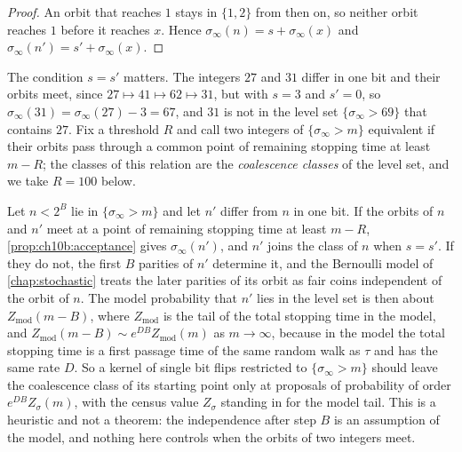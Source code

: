 \begin{proof}
An orbit that reaches $1$ stays in $\{1,2\}$ from then on, so neither orbit reaches $1$ before it reaches $x$. Hence $\sigma_\infty(n)=s+\sigma_\infty(x)$ and $\sigma_\infty(n')=s'+\sigma_\infty(x)$.
\end{proof}

The condition $s=s'$ matters. The integers $27$ and $31$ differ in one bit and their orbits meet, since $27\mapsto41\mapsto62\mapsto31$, but with $s=3$ and $s'=0$, so $\sigma_\infty(31)=\sigma_\infty(27)-3=67$, and $31$ is not in the level set $\{\sigma_\infty>69\}$ that contains $27$.
Fix a threshold $R$ and call two integers of $\{\sigma_\infty>m\}$ equivalent if their orbits pass through a common point of remaining stopping time at least $m-R$; the classes of this relation are the \emph{coalescence classes} of the level set, and we take $R=100$ below.

\begin{remark}\label{rem:ch10c:coalescence}
Let $n<2^B$ lie in $\{\sigma_\infty>m\}$ and let $n'$ differ from $n$ in one bit. If the orbits of $n$ and $n'$ meet at a point of remaining stopping time at least $m-R$, \cref{prop:ch10b:acceptance} gives $\sigma_\infty(n')$, and $n'$ joins the class of $n$ when $s=s'$. If they do not, the first $B$ parities of $n'$ determine it, and the Bernoulli model of \cref{chap:stochastic} treats the later parities of its orbit as fair coins independent of the orbit of $n$. The model probability that $n'$ lies in the level set is then about $Z_{\mathrm{mod}}(m-B)$, where $Z_{\mathrm{mod}}$ is the tail of the total stopping time in the model, and $Z_{\mathrm{mod}}(m-B)\sim e^{DB}Z_{\mathrm{mod}}(m)$ as $m\to\infty$, because in the model the total stopping time is a first passage time of the same random walk as $\tau$ and has the same rate $D$.
So a kernel of single bit flips restricted to $\{\sigma_\infty>m\}$ should leave the coalescence class of its starting point only at proposals of probability of order $e^{DB}Z_\sigma(m)$, with the census value $Z_\sigma$ standing in for the model tail.
This is a heuristic and not a theorem: the independence after step $B$ is an assumption of the model, and nothing here controls when the orbits of two integers meet.
\end{remark}

